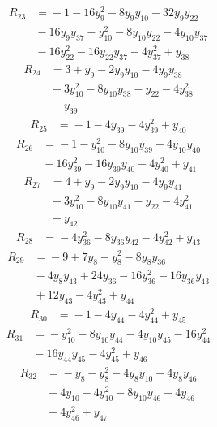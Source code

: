 \begin{align*}
R_{23} &={} -1 -16y_{9}^{2} -8y_{9}y_{10} -32y_{9}y_{22} \\
 &{} -16y_{9}y_{37} -y_{10}^{2} -8y_{10}y_{22} -4y_{10}y_{37} \\
 &{} -16y_{22}^{2} -16y_{22}y_{37} -4y_{37}^{2} +y_{38}
\end{align*}
\begin{align*}
R_{24} &={} 3 +y_{9} -2y_{9}y_{10} -4y_{9}y_{38} \\
 &{} -3y_{10}^{2} -8y_{10}y_{38} -y_{22} -4y_{38}^{2} \\
 &{} +y_{39}
\end{align*}
\begin{align*}
R_{25} &={} -1 -4y_{39} -4y_{39}^{2} +y_{40}
\end{align*}
\begin{align*}
R_{26} &={} -1 -y_{10}^{2} -8y_{10}y_{39} -4y_{10}y_{40} \\
 &{} -16y_{39}^{2} -16y_{39}y_{40} -4y_{40}^{2} +y_{41}
\end{align*}
\begin{align*}
R_{27} &={} 4 +y_{9} -2y_{9}y_{10} -4y_{9}y_{41} \\
 &{} -3y_{10}^{2} -8y_{10}y_{41} -y_{22} -4y_{41}^{2} \\
 &{} +y_{42}
\end{align*}
\begin{align*}
R_{28} &={} -4y_{36}^{2} -8y_{36}y_{42} -4y_{42}^{2} +y_{43}
\end{align*}
\begin{align*}
R_{29} &={} -9 +7y_{8} -y_{8}^{2} -8y_{8}y_{36} \\
 &{} -4y_{8}y_{43} +24y_{36} -16y_{36}^{2} -16y_{36}y_{43} \\
 &{} +12y_{43} -4y_{43}^{2} +y_{44}
\end{align*}
\begin{align*}
R_{30} &={} -1 -4y_{44} -4y_{44}^{2} +y_{45}
\end{align*}
\begin{align*}
R_{31} &={} -y_{10}^{2} -8y_{10}y_{44} -4y_{10}y_{45} -16y_{44}^{2} \\
 &{} -16y_{44}y_{45} -4y_{45}^{2} +y_{46}
\end{align*}
\begin{align*}
R_{32} &={} -y_{8} -y_{8}^{2} -4y_{8}y_{10} -4y_{8}y_{46} \\
 &{} -4y_{10} -4y_{10}^{2} -8y_{10}y_{46} -4y_{46} \\
 &{} -4y_{46}^{2} +y_{47}
\end{align*}
